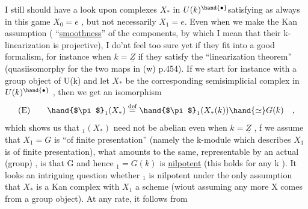 I still should have a look upon complexes $X_*$ in $U(k)^\hand{\bullet}$\hand{/}satisfying
\hand{(}as always in this game\hand{)} $X_0=e$ , but not necessarily $X_1 = e$. Even when
we make the Kan assumption ( ``\uline{smoothness}'' of the components,
by which I mean that their k-linearization is projective), I do'nt feel
too sure yet if they fit into a good formalism, for instance \hand{(}when $k=\underline{Z}$\hand{)}
if they satisfy the ``linearization theorem'' (quasiisomorphy for the two
maps in (w) p.454). If we start for instance with a group object of U(k)
and let $X_*$ be the corresponding semisimplicial complex in $U(k)^\hand{\bullet}$ , then
we get an isomorphism
\[ \text{(E)} \qquad \hand{$\pi$}_1(X_*) \overset{\text{def}}{=} \hand{$\pi$}_1(X_*(k)) \hand{\simeq} G(k) \quad , \]
which shows us that \hand{$\pi$}$_1(X_*)$ need not be abelian even when $k=\underline{Z}$ , 
 f we assume that $X_1 = G$ is ``of finite presentation''
(namely the  k-module which describes $X_1$ is of finite presentation), 
what amounts to the same, representable by an actual (group) , 
is  that G and hence \hand{$\pi$}$_1 = G(k)$ is \uline{nilpotent} (this holds for any k ).
It looks an intriguing question whether \hand{$\pi$}$_1$ is nilpotent under the only
assumption that $X_*$ is a  Kan complex with $X_1$ a scheme (wiout assuming
any more X comes from a group object). At any rate, it follows from



